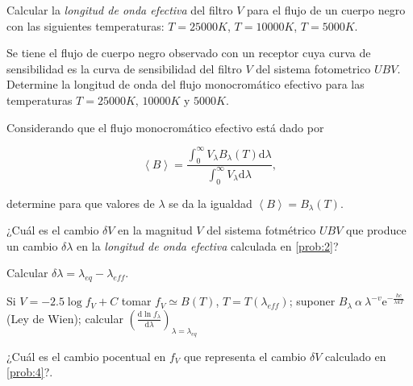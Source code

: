 \documentclass[12pt,a4paper]{practice}
\begin{document}
    \begin{problem}\label{prob:2}
        Calcular la \emph{longitud de onda efectiva} del filtro $V$ para el flujo de un cuerpo negro con las siguientes temperaturas: $T = 25000 K$, $T = 10000 K$, $T = 5000 K$.
    \end{problem}

    \begin{problem}\label{prob:3}
        Se tiene el flujo de cuerpo negro observado con un receptor cuya curva de sensibilidad es la curva de sensibilidad del filtro $V$ del sistema fotometrico $UBV$. Determine la longitud de onda del flujo monocromático efectivo para las temperaturas $T = 25000 K$, $10000 K$ y $5000 K$.

        \begin{recommendation}
            Considerando que el flujo monocromático efectivo está dado por

                $$\left\langle B\right\rangle = \frac{\displaystyle{\int_{0}^{\infty} V_{\lambda} B_{\lambda} \left(T\right) \mathrm{d}\lambda}}{\displaystyle{\int_{0}^{\infty} V_{\lambda} \mathrm{d}\lambda}},$$

            determine para que valores de $\lambda$ se da la igualdad $\left\langle B\right\rangle = B_{\lambda} \left(T\right)$.
        \end{recommendation}
    \end{problem}

    \begin{problem}\label{prob:4}
        ¿Cuál es el cambio $\delta V$ en la magnitud $V$ del sistema fotmétrico $UBV$ que produce un cambio $\delta\lambda$ en la \emph{longitud de onda efectiva} calculada en \ref{prob:2}?

        Calcular $\delta\lambda = {\lambda}_{eq} - {\lambda}_{eff}$.

        \begin{recommendation}
            Si $V = -2.5 \log f_V + C$ tomar $f_V \simeq B\left(T\right) $, $T=T\left({\lambda}_{eff}\right)$; suponer $B_{\lambda}\ \alpha\ {\lambda}^{-v} \mathrm{e}^{-\frac{hc}{\lambda k T}}$ (Ley de Wien); calcular $\left(\frac{\mathrm{d} \ln {f}_{\lambda}}{\mathrm{d}\lambda}\right)_{\lambda = {\lambda}_{eq}}$
        \end{recommendation}
    \end{problem}

    \begin{problem}\label{prob:5}
        ¿Cuál es el cambio pocentual en $f_V$ que representa el cambio $\delta V$ calculado en \ref{prob:4}?.
    \end{problem}
\end{document}
